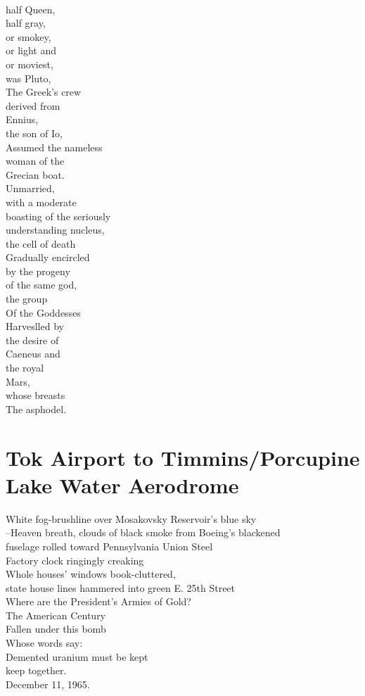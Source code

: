 \documentclass[smalldemyvopaper,11pt,twoside,onecolumn,openright,extrafontsizes]{memoir}
\begin{document}
\\half Queen,
\\half gray,
\\or smokey,
\\or light and
\\or moviest,
\\was Pluto,
\\The Greek's crew
\\derived from
\\Ennius,
\\the son of Io,
\\Assumed the nameless
\\woman of the
\\Grecian boat.
\\Unmarried,
\\with a moderate
\\boasting of the seriously
\\understanding nucleus,
\\the cell of death
\\Gradually encircled
\\by the progeny
\\of the same god,
\\the group
\\Of the Goddesses
\\Harveslled by
\\the desire of
\\Caeneus and
\\the royal
\\Mars,
\\whose breasts
\\The asphodel.



\chapter{Tok Airport to Timmins/Porcupine Lake Water Aerodrome}
White fog-brushline over Mosakovsky Reservoir's blue sky
\\--Heaven breath, clouds of black smoke from Boeing's blackened
\\fuselage rolled toward Pennsylvania Union Steel
\\Factory clock ringingly creaking
\\Whole houses' windows book-cluttered,
\\state house lines hammered into green E. 25th Street
\\Where are the President's Armies of Gold?
\\The American Century
\\Fallen under this bomb
\\Whose words say:
\\Demented uranium must be kept
\\keep together.
\\December 11, 1965.
\end{document}
